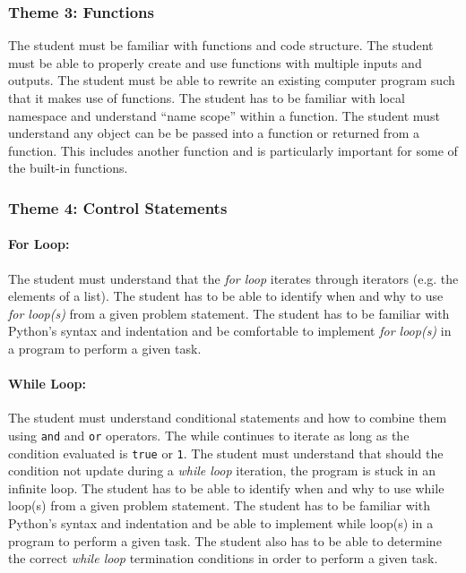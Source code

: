         \subsubsection{Theme 3: Functions}
            The student must be familiar with functions and code structure.
            The student must be able to properly create and use functions with
            multiple inputs and outputs.  The student must be able to rewrite
            an existing computer program such that it makes use of functions.
            The student has to be familiar with local namespace and understand
            ``name scope'' within a function.  The student must understand any
            object can be be passed into a function or returned from a
            function. This includes another function and is particularly
            important for some of the built-in functions.

        \subsubsection{Theme 4: Control Statements}
            \paragraph{For Loop:}
                The student must understand that the \textit{for loop} iterates
                through iterators (e.g. the elements of a list). The student
                has to be able to identify when and why to use \textit{for
                loop(s)} from a given problem statement. The student has to be
                familiar with Python's syntax and indentation and be
                comfortable to implement \textit{for loop(s)} in a program to
                perform a given task.

            \paragraph{While Loop:}
                The student must understand conditional statements and how to
                combine them using \texttt{and} and \texttt{or} operators. The
                while continues to iterate as long as the condition evaluated
                is \texttt{true} or \texttt{1}. The student must understand
                that should the condition not update during a \textit{while
                loop} iteration, the program is stuck in an infinite loop. The
                student has to be able to identify when and why to use while
                loop(s) from a given problem statement. The student has to be
                familiar with Python's syntax and indentation and be able to
                implement while loop(s) in a program to perform a given task.
                The student also has to be able to determine the correct
                \textit{while loop} termination conditions in order to perform
                a given task.

